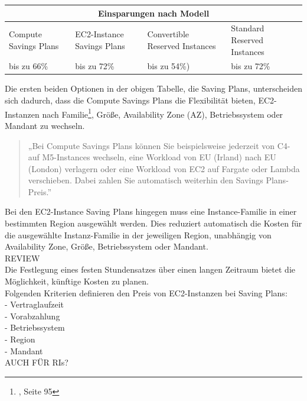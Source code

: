 \begin{table}[h!]
    \centering
    \begin{tabular}{ |p{3cm}||p{3cm}|p{3.6cm}|p{3.6cm}|  }
        \hline
        \multicolumn{4}{|c|}{Einsparungen nach Modell}                                                                    \\
        \hline
        Compute Savings Plans & EC2-Instance Savings Plans & Convertible Reserved Instances & Standard Reserved Instances \\
        \hline
        bis zu 66\%           & bis zu 72\%
                              & bis zu 54\%)               & bis zu 72\%
        \\
        \hline
    \end{tabular}
    {\cite{AMZ07,AMZ11}}
\end{table}
Die ersten beiden Optionen in der obigen Tabelle, die Saving Plans, unterscheiden sich dadurch, dass die Compute Savings Plans die Flexibilität bieten, EC2-Instanzen nach Familie\footnote{\cite{AWS1}, Seite 95}, Größe, Availability Zone (AZ), Betriebssystem oder Mandant zu wechseln.
\begin{quote}
    „Bei Compute Savings Plans können Sie beispielsweise jederzeit von C4- auf M5-Instances wechseln, eine Workload von EU (Irland) nach EU (London) verlagern oder eine Workload von EC2 auf Fargate oder Lambda verschieben. Dabei zahlen Sie automatisch weiterhin den Savings Plans-Preis.”
    {\cite{AMZ11}}
\end{quote}

Bei den EC2-Instance Saving Plans hingegen muss eine Instance-Familie in einer bestimmten Region ausgewählt werden.  Dies reduziert automatisch die Kosten für die ausgewählte Instanz-Familie in der jeweiligen Region, unabhängig von Availability Zone, Größe, Betriebssystem oder Mandant.
\\
REVIEW{
\\
Die Festlegung eines festen Stundensatzes über einen langen Zeitraum bietet die Möglichkeit, künftige Kosten zu planen.}
\\
Folgenden Kriterien definieren den Preis von EC2-Instanzen bei Saving Plans:
\\
- Vertraglaufzeit
\\
- Vorabzahlung
\\
- Betriebssystem
\\
- Region
\\
- Mandant
\\
AUCH FÜR RIs?


